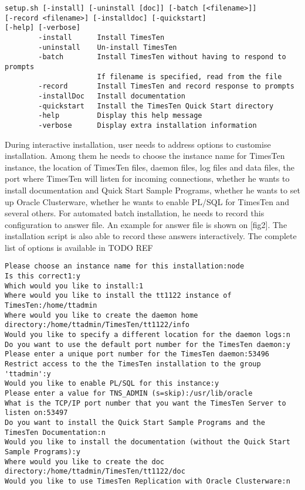 \documentclass[11pt, letterpaper]{article}
\begin{document}
\lstset{basicstyle=\ttfamily\scriptsize}
\begin{lstlisting}
setup.sh [-install] [-uninstall [doc]] [-batch [<filename>]]
[-record <filename>] [-installdoc] [-quickstart]
[-help] [-verbose]
        -install      Install TimesTen
        -uninstall    Un-install TimesTen
        -batch        Install TimesTen without having to respond to prompts
                      If filename is specified, read from the file
        -record       Install TimesTen and record response to prompts
        -installDoc   Install documentation
        -quickstart   Install the TimesTen Quick Start directory
        -help         Display this help message
        -verbose      Display extra installation information
\end{lstlisting}

During interactive installation, user needs to address options to customise installation. Among them he needs to choose the instance name for TimesTen instance, the location of TimesTen files, daemon files, log files and data files, the port where TimesTen will listen for incoming connections, whether he wants to install documentation and Quick Start Sample Programs, whether he wants to set up Oracle Clusterware, whether he wants to enable PL/SQL for TimesTen and several others. For automated batch installation, he needs to record this configuration to answer file. An example for answer file is shown on [fig2]. The installation script is also able to record these answers interactively. The complete list of options is available in TODO REF

\lstset{basicstyle=\ttfamily\scriptsize}
\begin{lstlisting}
Please choose an instance name for this installation:node
Is this correct1:y
Which would you like to install:1
Where would you like to install the tt1122 instance of TimesTen:/home/ttadmin
Where would you like to create the daemon home directory:/home/ttadmin/TimesTen/tt1122/info
Would you like to specify a different location for the daemon logs:n
Do you want to use the default port number for the TimesTen daemon:y
Please enter a unique port number for the TimesTen daemon:53496
Restrict access to the the TimesTen installation to the group 'ttadmin':y
Would you like to enable PL/SQL for this instance:y
Please enter a value for TNS_ADMIN (s=skip):/usr/lib/oracle
What is the TCP/IP port number that you want the TimesTen Server to listen on:53497
Do you want to install the Quick Start Sample Programs and the TimesTen Documentation:n
Would you like to install the documentation (without the Quick Start Sample Programs):y
Where would you like to create the doc directory:/home/ttadmin/TimesTen/tt1122/doc
Would you like to use TimesTen Replication with Oracle Clusterware:n
\end{lstlisting}
\end{document}
